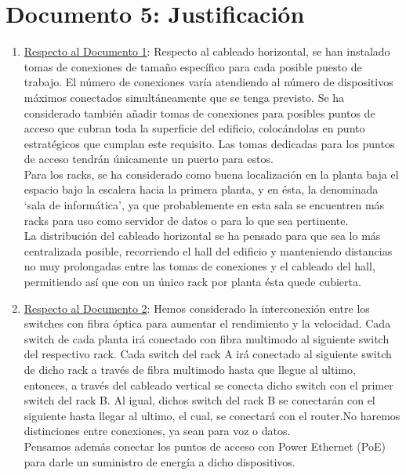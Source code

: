 \documentclass[]{article}
\begin{document}
\newpage

\section{Documento 5: Justificación}

\begin{enumerate}[label=\alph*]
   \item \underline{Respecto al Documento 1}:
	Respecto al cableado horizontal, se han instalado tomas de conexiones de tamaño específico para cada posible puesto de trabajo. El número de conexiones varía atendiendo al número de dispositivos máximos conectados simultáneamente que se tenga previsto. Se ha considerado también añadir tomas de conexiones para posibles puntos de acceso que cubran toda la superficie del edificio, colocándolas en punto estratégicos que cumplan este requisito. Las tomas dedicadas para los puntos de acceso tendrán únicamente un puerto para estos. \\
	Para los racks, se ha  considerado como buena localización en la planta baja el espacio bajo la escalera hacia la primera planta, y en ésta, la denominada `sala de informática', ya que probablemente en esta sala se encuentren más racks para uso como servidor de datos o para lo que sea pertinente. \\
	La distribución del cableado horizontal se ha pensado para que sea lo más centralizada posible, recorriendo el hall del edificio y manteniendo distancias no muy prolongadas entre las tomas de conexiones y el cableado del hall, permitiendo así que con un único rack por planta ésta quede cubierta.
   \item \underline{Respecto al Documento 2}:
        Hemos considerado la interconexión entre los switches con fibra óptica para aumentar el rendimiento y la velocidad. Cada switch de cada planta irá conectado con fibra multimodo al siguiente switch del respectivo rack. Cada switch del rack A irá conectado al siguiente switch de dicho rack a través de fibra multimodo hasta que llegue al ultimo, entonces, a través del cableado vertical se conecta dicho switch con el primer switch del rack B. Al igual, dichos switch del rack B se conectarán con el siguiente hasta llegar al ultimo, el cual, se conectará con el router.No haremos distinciones entre conexiones, ya sean para voz o datos. \\
        Pensamos además conectar los puntos de acceso con Power Ethernet (PoE) para darle un suministro de energía a dicho dispositivos. \\

\end{enumerate}
\end{document}
